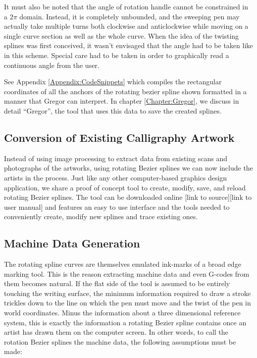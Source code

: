     It must also be noted that the angle of rotation handle cannot be constrained in a $2\pi$ domain. Instead, it is completely unbounded, and the sweeping pen may actually take multiple turns both clockwise and anticlockwise while moving on a single curve section as well as the whole curve. When the idea of the twisting splines was first conceived, it wasn’t envisaged that the angle had to be taken like in this scheme. Special care had to be taken in order to graphically read a continuous angle from the user.

    See Appendix \ref{Appendix:CodeSnippets} which compiles the rectangular coordinates of all the anchors of the rotating bezier spline shown formatted in a manner that Gregor can interpret. In chapter \ref{Chapter:Gregor}, we discuss in detail ``Gregor'', the tool that uses this data to save the created splines.

    \subsection{Conversion of Existing Calligraphy Artwork}
    Instead of using image processing to extract data from existing scans and photographs of the artworks, using rotating Bezier splines we can now include the artists in the process. Just like any other computer-based graphics design application, we share a proof of concept tool to create, modify, save, and reload rotating Bezier splines. The tool can be downloaded online [link to source][link to user manual] and features an easy to use interface and the tools needed to conveniently create, modify new splines and trace existing ones.

    \subsection{Machine Data Generation}
    \label{ExplorationPoints1}
    The rotating spline curves are themselves emulated ink-marks of a broad edge marking tool. This is the reason extracting machine data and even G-codes from them becomes natural. If the flat side of the tool is assumed to be entirely touching the writing surface, the minimum information required to draw a stroke trickles down to the line on which the pen must move and the twist of the pen in world coordinates. Minus the information about a three dimensional reference system, this is exactly the information a rotating Bezier spline contains once an artist has drawn them on the computer screen. In other words, to call the rotation Bezier splines the machine data, the following assumptions must be made:

